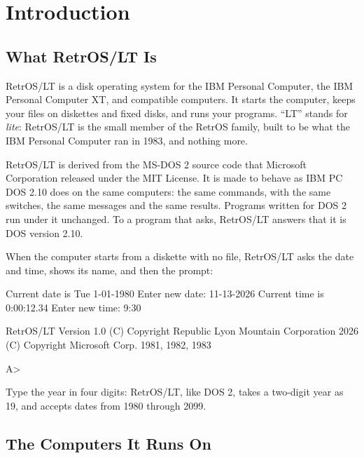 \mwnewpart
\renewcommand\runningtitle{Section 1. Introduction}
\chapter{Introduction}
\sectioncontents

\section{What RetrOS/LT Is}

RetrOS/LT is a disk operating system for the IBM Personal Computer, the
IBM Personal Computer XT, and compatible computers. It starts the
computer, keeps your files on diskettes and fixed disks, and runs your
programs. ``LT'' stands for \emph{lite}: RetrOS/LT is the small member of
the RetrOS family, built to be what the IBM Personal Computer ran in 1983,
and nothing more.

RetrOS/LT is derived from the MS-DOS 2 source code that Microsoft
Corporation released under the MIT License. It is made to behave as IBM
PC DOS 2.10 does on the same computers: the same commands, with the same
switches, the same messages and the same results. Programs written for DOS
2 run under it unchanged. To a program that asks, RetrOS/LT answers that
it is DOS version 2.10.

When the computer starts from a diskette with no 
file, RetrOS/LT asks the date and time, shows its name, and then the
prompt:

\begin{dialogue}
Current date is Tue  1-01-1980
Enter new date: 11-13-2026
Current time is  0:00:12.34
Enter new time: 9:30


RetrOS/LT Version 1.0
(C) Copyright Republic Lyon Mountain Corporation 2026
(C) Copyright Microsoft Corp. 1981, 1982, 1983

A>
\end{dialogue}

Type the year in four digits: RetrOS/LT, like DOS 2, takes a two-digit
year as 19, and accepts dates from 1980 through 2099.

\section{The Computers It Runs On}

